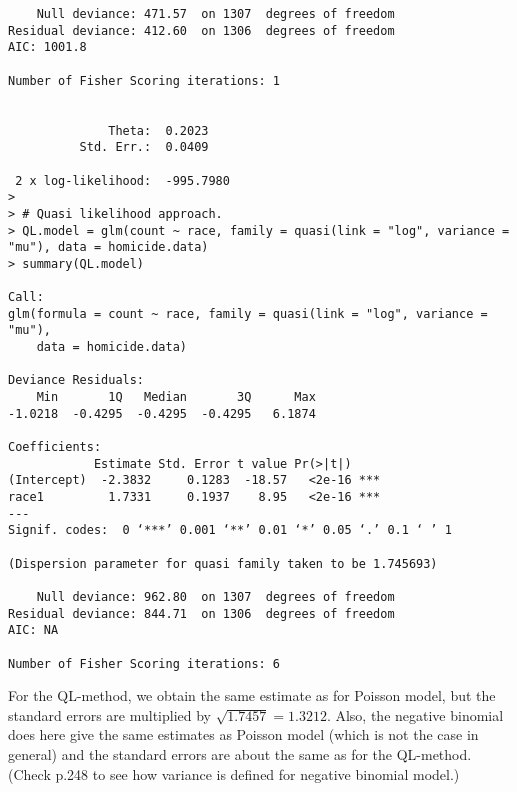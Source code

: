 \documentclass[a4paper]{article}
\begin{document}
\begin{lstlisting}
    Null deviance: 471.57  on 1307  degrees of freedom
Residual deviance: 412.60  on 1306  degrees of freedom
AIC: 1001.8

Number of Fisher Scoring iterations: 1


              Theta:  0.2023 
          Std. Err.:  0.0409 

 2 x log-likelihood:  -995.7980 
> 
> # Quasi likelihood approach.
> QL.model = glm(count ~ race, family = quasi(link = "log", variance = "mu"), data = homicide.data)
> summary(QL.model)

Call:
glm(formula = count ~ race, family = quasi(link = "log", variance = "mu"), 
    data = homicide.data)

Deviance Residuals: 
    Min       1Q   Median       3Q      Max  
-1.0218  -0.4295  -0.4295  -0.4295   6.1874  

Coefficients:
            Estimate Std. Error t value Pr(>|t|)    
(Intercept)  -2.3832     0.1283  -18.57   <2e-16 ***
race1         1.7331     0.1937    8.95   <2e-16 ***
---
Signif. codes:  0 ‘***’ 0.001 ‘**’ 0.01 ‘*’ 0.05 ‘.’ 0.1 ‘ ’ 1

(Dispersion parameter for quasi family taken to be 1.745693)

    Null deviance: 962.80  on 1307  degrees of freedom
Residual deviance: 844.71  on 1306  degrees of freedom
AIC: NA

Number of Fisher Scoring iterations: 6
\end{lstlisting}
For the QL-method, we obtain the same estimate as for Poisson model, but the standard errors are multiplied by $\sqrt{1.7457} = 1.3212$. Also, the negative binomial does here give the same estimates as Poisson model (which is not the case in general) and the standard errors are about the same as for the QL-method. (Check p.248 to see how variance is defined for negative binomial model.)



\vspace{\baselineskip}
\end{document}
